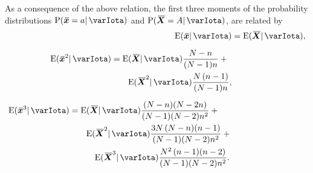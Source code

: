 \documentclass{article}
\theoremstyle{remark}
\theoremstyle{innote}
\renewcommand*{\|}{\mathpunct{|}}%
\newcommand*{\p}{\mathrm{P}}%
\newcommand*{\E}{\mathrm{E}}
\DeclarePairedDelimiter\expp{(}{)}
\newcommand*{\expe}{\E\expp}%
\theoremstyle{simple}
\newcommand*{\widebar}[1]{{\mkern1.5mu\skew{2}\overline{\mkern-1.5mu#1\mkern-1.5mu}\mkern 1.5mu}}
\newcommand*{\av}{\widebar} %
\newcommand*{\sav}{\widebar} %
\newcommand*{\yxx}{x}%
\newcommand*{\yx}{\bm{\yxx}}%
\newcommand*{\yxs}{\sav{\yx}}%
\newcommand*{\yX}{\bm{X}}%
\newcommand*{\yXf}{\av{\yX}}%
\newcommand*{\yH}{\varIota}
\begin{document}
As a consequence of the above relation, the first three moments of the
probability distributions $\p(\yxs=a\|\yH)$ and $\p(\yXf=A\|\yH)$,
are related by
\begin{subequations}\label{eq:moments}
  \begin{align}
    \expe{\yxs \| \yH} &= \expe{\yXf \| \yH},
    \\[2\jot]
    \begin{split}
    \expe{\yxs^2 \| \yH} &= \expe{\yXf \| \yH}
                                  \frac{N-n}{(N-1)n}
 +{}
\\&\quad\quad \expe{\yXf^2 \| \yH}\frac{N\,(n-1)}{(N-1)n},
\end{split}
    \\[2\jot]
    \begin{split}
    \expe{\yxs^3 \| \yH} &=
                              \expe{\yXf \| \yH}\frac{(N-n)(N-2n)}{(N-1)(N-2)n^2}+{}
                                    \\
                                    &\quad\quad\expe{\yXf^2 \| \yH}
                                    \frac{3N\,(N-n)(n-1)}{(N-1)(N-2)n^2} +{}
                                    \\
                                    &\quad\quad\quad\expe{\yXf^3 \| \yH}
                                    \frac{N^2\,(n-1)(n-2)}{(N-1)(N-2)n^2}.
                                  \end{split}
  \end{align}
\end{subequations}
\end{document}

